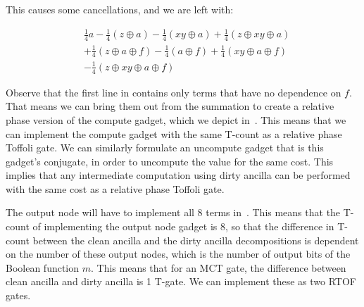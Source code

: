 This causes some cancellations, and we are left with:

\begin{equation}
  \label{eq-toff-simp}
  \begin{aligned}
    &\frac{1}{4}a - \frac{1}{4}(z \oplus a) - \frac{1}{4}(xy \oplus a) + \frac{1}{4}(z \oplus xy \oplus a)  \\
    &+ \frac{1}{4}(z \oplus a \oplus f) - \frac{1}{4}(a \oplus f) + \frac{1}{4}(xy \oplus a \oplus f) \\
    &- \frac{1}{4}(z \oplus xy \oplus a \oplus f)
  \end{aligned}
\end{equation}

Observe that the first line in contains only terms that have no dependence on $f$.
That means we can bring them out from the summation to create a relative phase version of the compute
gadget, which we depict in~. This means that we can implement the compute
gadget with the same T-count as a relative phase Toffoli gate. We can similarly formulate an uncompute
gadget that is this gadget's conjugate, in order to uncompute the value for the same cost. This implies
that any intermediate computation using dirty ancilla can be performed with the same cost as a relative
phase Toffoli gate. 

The output node will have to implement all 8 terms in~. This means that the T-count of
implementing the output node gadget is 8, so that the difference in T-count between the clean ancilla and
the dirty ancilla decompositions is dependent on the number of these output nodes, which is the number of
output bits of the Boolean function $m$. This means that for an MCT gate, the difference between clean
ancilla and dirty ancilla is 1 T-gate. We can implement these as two RTOF gates.

